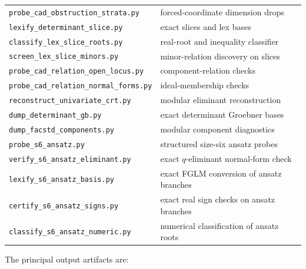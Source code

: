 \documentclass[11pt]{article}
\numberwithin{equation}{section}
\theoremstyle{definition}
\begin{document}
\begin{center}
\small
\begin{tabular}{@{}ll@{}}
\texttt{probe\_cad\_obstruction\_strata.py} & forced-coordinate dimension drops\\
\texttt{lexify\_determinant\_slice.py} & exact slices and lex bases\\
\texttt{classify\_lex\_slice\_roots.py} & real-root and inequality classifier\\
\texttt{screen\_lex\_slice\_minors.py} & minor-relation discovery on slices\\
\texttt{probe\_cad\_relation\_open\_locus.py} & component-relation checks\\
\texttt{probe\_cad\_relation\_normal\_forms.py} & ideal-membership checks\\
\texttt{reconstruct\_univariate\_crt.py} & modular eliminant reconstruction\\
\texttt{dump\_determinant\_gb.py} & exact determinant Groebner bases\\
\texttt{dump\_facstd\_components.py} & modular component diagnostics\\
\texttt{probe\_s6\_ansatz.py} & structured size-six ansatz probes\\
\texttt{verify\_s6\_ansatz\_eliminant.py} & exact \(q\)-eliminant normal-form check\\
\texttt{lexify\_s6\_ansatz\_basis.py} & exact FGLM conversion of ansatz branches\\
\texttt{certify\_s6\_ansatz\_signs.py} & exact real sign checks on ansatz branches\\
\texttt{classify\_s6\_ansatz\_numeric.py} & numerical classification of ansatz roots
\end{tabular}
\end{center}
The principal output artifacts are:
\end{document}
